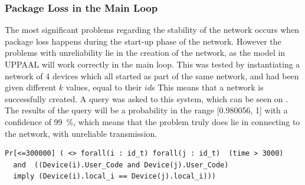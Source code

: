 \subsubsection{Package Loss in the Main Loop}
\vspace{-7pt}
The most significant problems regarding the stability of the network occurs when package loss happens during the start-up phase of the network.
However the problems with unreliability lie in the creation of the network, as the model in UPPAAL will work correctly in the main loop.
This was tested by instantiating a network of 4 devices which all started as part of the same network, and had been given different $k$ values, equal to their $id$s
This means that a network is successfully created.
A query was asked to this system, which can be seen on .
The results of the query will be a probability in the range [0.980056, 1] with a confidence of 99~\%, which means that the problem truly does lie in connecting to the network, with unreliable transmission. 

\begin{lstlisting}[style=UPPAAL, caption={Query for UPPAAL asking if for all devices i and j, when they are in the location \texttt{User\_Code} will they have they then have the same value for \texttt{local\_i}.}, label={stable-network-query}, float=p]
Pr[<=300000] ( <> forall(i : id_t) forall(j : id_t)  (time > 3000) 
  and  ((Device(i).User_Code and Device(j).User_Code) 
  imply (Device(i).local_i == Device(j).local_i)))
\end{lstlisting} 
 
